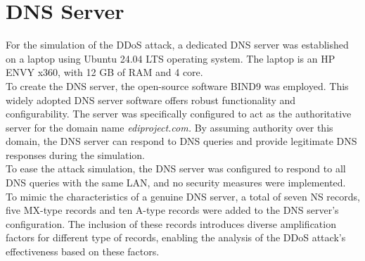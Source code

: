 \section{DNS Server}
For the simulation of the DDoS attack, a dedicated DNS server was established on a laptop using Ubuntu 24.04 LTS operating system.
The laptop is an HP ENVY x360, with 12 GB of RAM and 4 core.\\
To create the DNS server, the open-source software BIND9 was employed. This widely adopted DNS server software offers robust functionality and configurability.
The server was specifically configured to act as the authoritative server for the domain name \textit{ediproject.com.}
By assuming authority over this domain, the DNS server can respond to DNS queries and provide legitimate DNS responses during the simulation.\\
To ease the attack simulation, the DNS server was configured to respond to all DNS queries with the same LAN, and no security measures were implemented.
To mimic the characteristics of a genuine DNS server, a total of seven NS records, five MX-type records and ten A-type records were added to the DNS server's configuration.
The inclusion of these records introduces diverse amplification factors for different type of records, enabling the analysis of the DDoS attack's effectiveness based on these factors.
